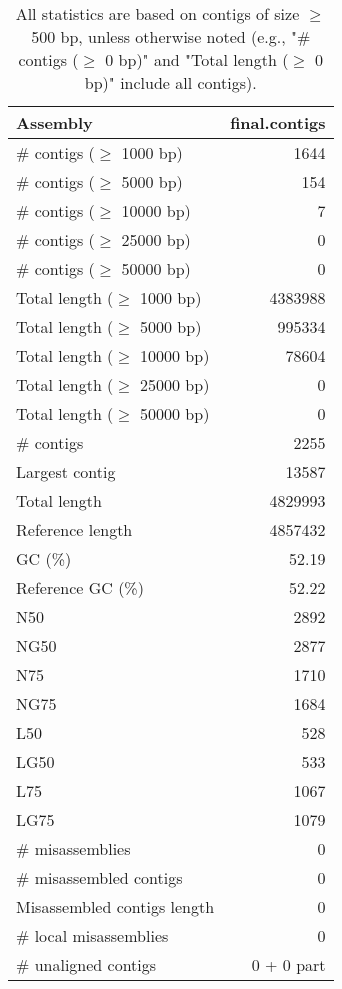 \documentclass[12pt,a4paper]{article}
\begin{document}
\begin{table}[ht]
\begin{center}
\caption{All statistics are based on contigs of size $\geq$ 500 bp, unless otherwise noted (e.g., "\# contigs ($\geq$ 0 bp)" and "Total length ($\geq$ 0 bp)" include all contigs).}
\begin{tabular}{|l*{1}{|r}|}
\hline
Assembly & final.contigs \\ \hline
\# contigs ($\geq$ 1000 bp) & 1644 \\ \hline
\# contigs ($\geq$ 5000 bp) & 154 \\ \hline
\# contigs ($\geq$ 10000 bp) & 7 \\ \hline
\# contigs ($\geq$ 25000 bp) & 0 \\ \hline
\# contigs ($\geq$ 50000 bp) & 0 \\ \hline
Total length ($\geq$ 1000 bp) & 4383988 \\ \hline
Total length ($\geq$ 5000 bp) & 995334 \\ \hline
Total length ($\geq$ 10000 bp) & 78604 \\ \hline
Total length ($\geq$ 25000 bp) & 0 \\ \hline
Total length ($\geq$ 50000 bp) & 0 \\ \hline
\# contigs & 2255 \\ \hline
Largest contig & 13587 \\ \hline
Total length & 4829993 \\ \hline
Reference length & 4857432 \\ \hline
GC (\%) & 52.19 \\ \hline
Reference GC (\%) & 52.22 \\ \hline
N50 & 2892 \\ \hline
NG50 & 2877 \\ \hline
N75 & 1710 \\ \hline
NG75 & 1684 \\ \hline
L50 & 528 \\ \hline
LG50 & 533 \\ \hline
L75 & 1067 \\ \hline
LG75 & 1079 \\ \hline
\# misassemblies & 0 \\ \hline
\# misassembled contigs & 0 \\ \hline
Misassembled contigs length & 0 \\ \hline
\# local misassemblies & 0 \\ \hline
\# unaligned contigs & 0 + 0 part \\ \hline

\end{tabular}
\end{center}
\end{table}
\end{document}
